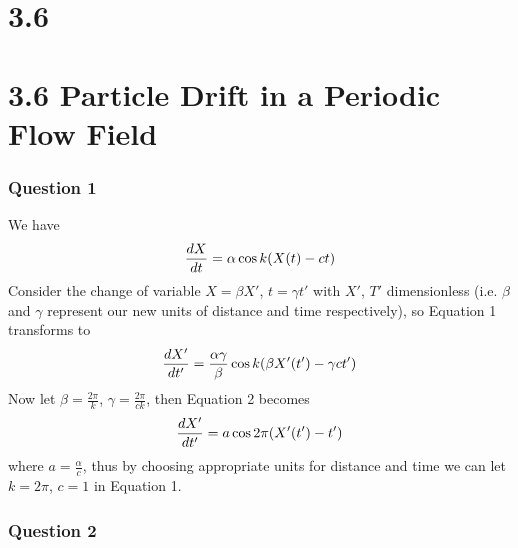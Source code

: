 \documentclass[11pt]{article} %
\let\originalleft\left
\let\originalright\right
\renewcommand{\left}{\mathopen{}\mathclose\bgroup\originalleft}
\renewcommand{\right}{\aftergroup\egroup\originalright}
\begin{document}
\section*{3.6}
\vspace*{4cm}

\section*{3.6 Particle Drift in a Periodic Flow Field}

\subsubsection*{Question 1}
We have
\begin{equation}
	\frac{dX}{dt} = \alpha \cos k \left( X\left( t \right) - ct \right)
\end{equation}
Consider the change of variable $X = \beta X'$, $t = \gamma t'$ with $X'$, $T'$ dimensionless (i.e. $\beta$ and $\gamma$ represent our new units of distance and time respectively), so Equation 1 transforms to 
\begin{equation}
	\frac{dX'}{dt'} = \frac{\alpha \gamma}{\beta} \cos k \left( \beta X'\left( t' \right) - \gamma ct' \right)
\end{equation}
Now let $\beta = \frac{2 \pi}{k}$, $\gamma = \frac{2 \pi}{ck}$, then Equation 2 becomes
\begin{equation}
	\frac{dX'}{dt'} = a \cos 2\pi \left( X'\left( t' \right) - t' \right)
\end{equation}
where $a = \frac{\alpha}{c}$, thus by choosing appropriate units for distance and time we can let $k=2\pi$, $c=1$ in Equation 1.
\subsubsection*{Question 2}
\end{document}
